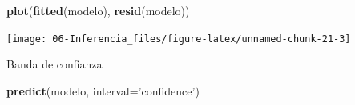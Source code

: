 \documentclass[]{book}
\newenvironment{Shaded}{\begin{snugshade}}{\end{snugshade}}
\newcommand{\DataTypeTok}[1]{\textcolor[rgb]{0.13,0.29,0.53}{#1}}
\newcommand{\KeywordTok}[1]{\textcolor[rgb]{0.13,0.29,0.53}{\textbf{#1}}}
\newcommand{\NormalTok}[1]{#1}
\newcommand{\StringTok}[1]{\textcolor[rgb]{0.31,0.60,0.02}{#1}}
\begin{document}
\begin{Shaded}
\begin{Highlighting}[]
\KeywordTok{plot}\NormalTok{(}\KeywordTok{fitted}\NormalTok{(modelo), }\KeywordTok{resid}\NormalTok{(modelo))}
\end{Highlighting}
\end{Shaded}

\begin{center}\texttt{[image: 06-Inferencia\_files/figure-latex/unnamed-chunk-21-3]} \end{center}

Banda de confianza

\begin{Shaded}
\begin{Highlighting}[]
\KeywordTok{predict}\NormalTok{(modelo, }\DataTypeTok{interval=}\StringTok{'confidence'}\NormalTok{)}
\end{Highlighting}
\end{Shaded}
\end{document}

